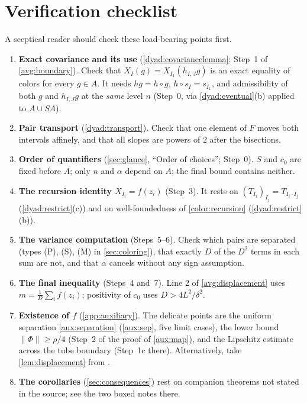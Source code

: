 \documentclass[11pt]{article}
\newcommand{\norm}[1]{\lVert #1\rVert}
\theoremstyle{definition}
\numberwithin{equation}{section}
\begin{document}
\section*{Verification checklist}

A sceptical reader should check these load-bearing points first.
\begin{enumerate}
\item \textbf{Exact covariance and its use} (\cref{dyad:covariancelemma};
Step~1 of \cref{avg:boundary}). Check that \(X_I(g)=X_{I_1}(h_{I,J}g)\) is an
exact equality of colors for every \(g\in A\). It needs \(hg=h\circ g\),
\(h\circ s_I=s_{I_1}\), and admissibility of both \(g\) and \(h_{I,J}g\) at
the \emph{same} level \(n\) (Step~0, via \cref{dyad:eventual}(b) applied to
\(A\cup SA\)).
\item \textbf{Pair transport} (\cref{dyad:transport}). Check that one element
of \(F\) moves both intervals affinely, and that all slopes are powers of
\(2\) after the bisections.
\item \textbf{Order of quantifiers} (\cref{sec:glance}, ``Order of choices'';
Step~0). \(S\) and \(c_0\) are fixed before \(A\); only \(n\) and \(\alpha\)
depend on \(A\); the final bound contains neither.
\item \textbf{The recursion identity \(X_{I_i}=f(z_i)\)} (Step~3). It rests
on \((T_{I_i})_{I_j}=T_{I_i\cdot I_j}\) (\cref{dyad:restrict}(c)) and on
well-foundedness of \eqref{color:recursion} (\cref{dyad:restrict}(b)).
\item \textbf{The variance computation} (Steps~5--6). Check which pairs are
separated (types (P), (S), (M) in \cref{sec:coloring}), that exactly \(D\) of
the \(D^2\) terms in each sum are not, and that \(\alpha\) cancels without
any sign assumption.
\item \textbf{The final inequality} (Steps~4 and~7). Line 2 of
\eqref{avg:displacement} uses \(m=\frac1D\sum_if(z_i)\); positivity of \(c_0\)
uses \(D>4L^2/\delta^2\).
\item \textbf{Existence of \(f\)} (\cref{app:auxiliary}). The delicate points
are the uniform separation \eqref{aux:separation} (\cref{aux:sep}, five limit
cases), the lower bound \(\norm{\Phi}\ge\rho/4\) (Step~2 of the proof of
\cref{aux:map}), and the Lipschitz estimate across the tube boundary (Step~1c
there). Alternatively, take \cref{lem:displacement} from
\cite{BenyaminiSternfeld1983}.
\item \textbf{The corollaries} (\cref{sec:consequences}) rest on companion
theorems not stated in the source; see the two boxed notes there.
\end{enumerate}



\end{document}

